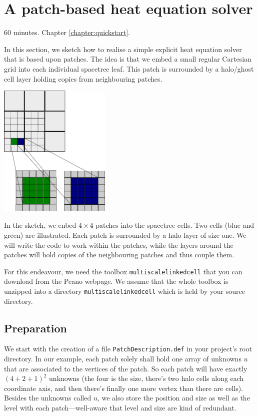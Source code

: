 \section{A patch-based heat equation solver}


\chapterDescription
  {
    60 minutes.
  }
  {
    Chapter \ref{chapter:quickstart}.
  }

In this section, we sketch how to realise a simple explicit heat equation
solver that is based upon patches.
The idea is that we embed a small regular Cartesian grid into each individual
spacetree leaf.
This patch is surrounded by a halo/ghost cell layer holding copies from
neighbouring patches.

\begin{center}
  \includegraphics[width=0.4\textwidth]{44_patch-based-solver/patches.pdf}
\end{center}

In the sketch, we enbed $4\times 4$ patches into the spacetree cells.
Two cells (blue and green) are illustrated.
Each patch is surrounded by a halo layer of size one.
We will write the code to work within the patches, while the layers around the
patches will hold copies of the neighbouring patches and thus couple them.

For this endeavour, we need the toolbox \texttt{multiscalelinkedcell} that you
can download from the Peano webpage.
We assume that the whole toolbox is unzipped into a directory
\texttt{multiscalelinkedcell} which is held by your source directory.


\subsection{Preparation}

We start with the creation of a file \texttt{PatchDescription.def} in your
project's root directory. 
In our example, each patch solely shall hold one array of unknowns $u$ that are
associated to the vertices of the patch.
So each patch will have exactly $(4+2+1)^2$ unknowns (the four is the size,
there's two halo cells along each coordinate axis, and then there's finally one
more vertex than there are cells).
Besides the unknowns called $u$, we also store the position and size as well as
the level with each patch---well-aware that level and size are kind of
redundant.

